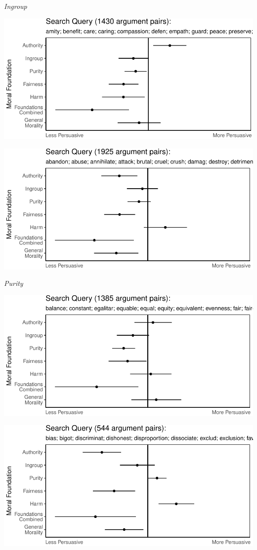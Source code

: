\documentclass[11pt,]{article}
\begin{document}
\emph{Ingroup}

\includegraphics{prelim_files/figure-latex/unnamed-chunk-7-1.pdf}

\includegraphics{prelim_files/figure-latex/unnamed-chunk-8-1.pdf}

\emph{Purity}

\includegraphics{prelim_files/figure-latex/unnamed-chunk-9-1.pdf}

\includegraphics{prelim_files/figure-latex/unnamed-chunk-10-1.pdf}
\end{document}
